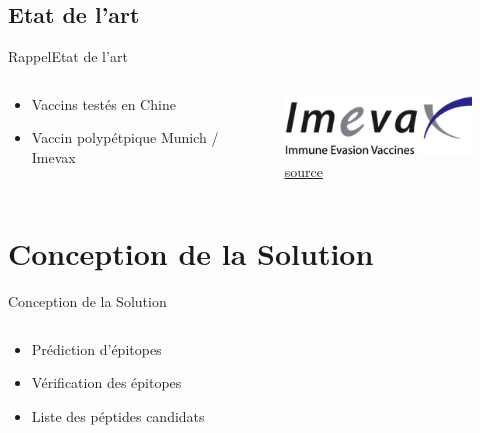\documentclass{PresentationHEIGVD}
\begin{document}
\subsection{Etat de l'art}
\begin{frame}{Rappel}{Etat de l'art}
\begin{columns}[c]
	\begin{column}[c]{5cm}
		\begin{itemize}[<+->]
			\item Vaccins testés en Chine
			\item Vaccin polypétpique Munich / Imevax
		\end{itemize}
	\end{column}
	\begin{column}[c]{5cm}
		\begin{figure}
		\includegraphics[width=\textwidth]{img/imevax.png}
		\caption{\href{http://www.imevax.com/wp-content/uploads/2013/01/Imevax_Logo_V31.png}{source}}
	\end{figure}
	\end{column}
\end{columns}
\end{frame}

\section{Conception de la Solution}
\begin{frame}{Conception de la Solution}
\begin{columns}[c]
	\begin{column}[c]{5cm}
		\begin{itemize}[<+->]
			\item Prédiction d'épitopes
			\item Vérification des épitopes
			\item Liste des péptides candidats
		\end{itemize}
	\end{column}
	\begin{column}[c]{5cm}
		
	\end{column}
\end{columns}
\end{frame}
\end{document}
